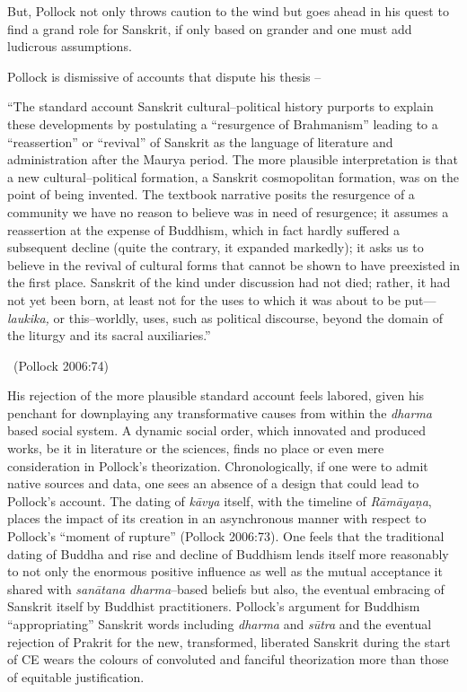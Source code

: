 But, Pollock not only throws caution to the wind but goes ahead in his quest to find a grand role for Sanskrit, if only based on grander and one must add ludicrous assumptions.

Pollock is dismissive of accounts that dispute his thesis –

\begin{myquote}
“The standard account Sanskrit cultural–political history purports to explain these developments by postulating a “resurgence of Brahmanism” leading to a “reassertion” or “revival” of Sanskrit as the language of literature and administration after the Maurya period. The more plausible interpretation is that a new cultural–political formation, a Sanskrit cosmopolitan formation, was on the point of being invented. The textbook narrative posits the resurgence of a community we have no reason to believe was in need of resurgence; it assumes a reassertion at the expense of Buddhism, which in fact hardly suffered a subsequent decline (quite the contrary, it expanded markedly); it asks us to believe in the revival of cultural forms that cannot be shown to have preexisted in the first place. Sanskrit of the kind under discussion had not died; rather, it had not yet been born, at least not for the uses to which it was about to be put—\textit{laukika,} or this–worldly, uses, such as political discourse, beyond the domain of the liturgy and its sacral auxiliaries.” 

~\hfill (Pollock 2006:74)
\end{myquote}

His rejection of the more plausible standard account feels labored, given his penchant for downplaying any transformative causes from within the \textit{dharma} based social system. A dynamic social order, which innovated and produced works, be it in literature or the sciences, finds no place or even mere consideration in Pollock’s theorization. Chronologically, if one were to admit native sources and data, one sees an absence of a design that could lead to Pollock’s account. The dating of \textit{kāvya} itself, with the timeline of \textit{Rāmāyaṇa}, places the impact of its creation in an asynchronous manner with respect to Pollock’s “moment of rupture” (Pollock 2006:73). One feels that the traditional dating of Buddha and rise and decline of Buddhism lends itself more reasonably to not only the enormous positive influence as well as the mutual acceptance it shared with \textit{sanātana dharma}–based beliefs but also, the eventual embracing of Sanskrit itself by Buddhist practitioners. Pollock’s argument for Buddhism “appropriating” Sanskrit words including \textit{dharma} and \textit{sūtra} and the eventual rejection of Prakrit for the new, transformed, liberated Sanskrit during the start of CE wears the colours of convoluted and fanciful theorization more than those of equitable justification.

